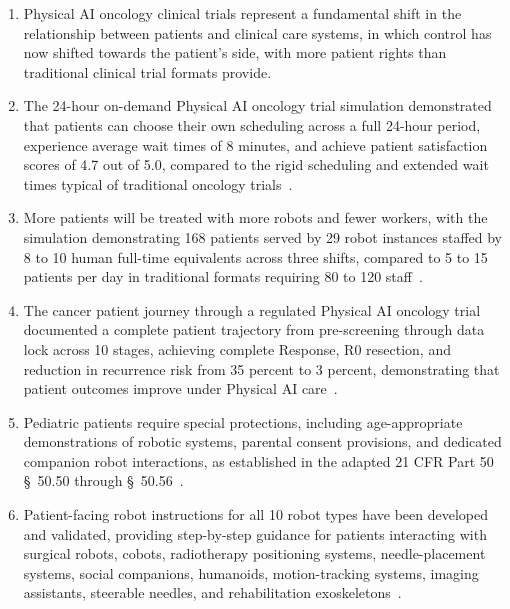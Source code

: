 \begin{enumerate}[label=(\alph*)]
\item Physical AI oncology clinical trials represent a fundamental shift in the
  relationship between patients and clinical care systems, in which control has
  now shifted towards the patient's side, with more patient rights than
  traditional clinical trial formats provide.

\item The 24-hour on-demand Physical AI oncology trial simulation demonstrated
  that patients can choose their own scheduling across a full 24-hour period,
  experience average wait times of 8 minutes, and achieve patient satisfaction
  scores of 4.7 out of 5.0, compared to the rigid scheduling and extended
  wait times typical of traditional oncology trials~\cite{newtrial2026}.

\item More patients will be treated with more robots and fewer workers, with the
  simulation demonstrating 168 patients served by 29 robot instances staffed
  by 8 to 10 human full-time equivalents across three shifts, compared to 5 to
  15 patients per day in traditional formats requiring 80 to 120
  staff~\cite{formatcomparison2026}.

\item The cancer patient journey through a regulated Physical AI oncology trial
  documented a complete patient trajectory from pre-screening through data
  lock across 10 stages, achieving complete Response, R0 resection, and
  reduction in recurrence risk from 35 percent to 3 percent, demonstrating
  that patient outcomes improve under Physical AI
  care~\cite{patientjourney2026}.

\item Pediatric patients require special protections, including age-appropriate
  demonstrations of robotic systems, parental consent provisions, and dedicated
  companion robot interactions, as established in the adapted 21 CFR Part 50
  \S~50.50 through \S~50.56~\cite{cfr50adapt}.

\item Patient-facing robot instructions for all 10 robot types have been
  developed and validated, providing step-by-step guidance for patients
  interacting with surgical robots, cobots, radiotherapy positioning systems,
  needle-placement systems, social companions, humanoids, motion-tracking
  systems, imaging assistants, steerable needles, and rehabilitation
  exoskeletons~\cite{patientinstructions2026}.


\end{enumerate}
